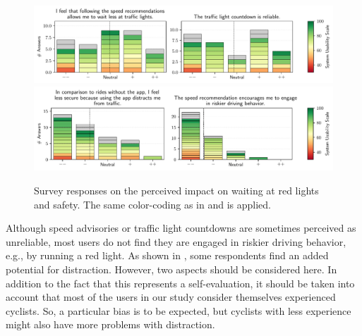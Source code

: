 \begin{figure}[t]
\caption{Survey responses on the perceived impact on waiting at red lights and safety. The same color-coding as in  and  is applied.}\label{fig:waiting-time-at-traffic-lights}
\includegraphics[width=\linewidth]{images/app-usability-questions-waiting-time-at-traffic-lights.pdf} 
\\
\includegraphics[width=\linewidth]{images/app-usability-questions-app-impact-on-safety.pdf}
\end{figure}

Although speed advisories or traffic light countdowns are sometimes perceived as unreliable, most users do not find they are engaged in riskier driving behavior, e.g., by running a red light. As shown in , some respondents find an added potential for distraction. However, two aspects should be considered here. In addition to the fact that this represents a self-evaluation, it should be taken into account that most of the users in our study consider themselves experienced cyclists. So, a particular bias is to be expected, but cyclists with less experience might also have more problems with distraction.

